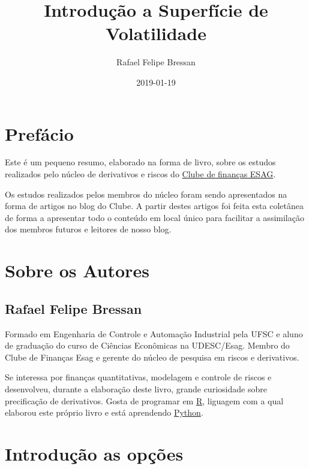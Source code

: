 \documentclass[]{book}
\title{Introdução a Superfície de Volatilidade}
\author{Rafael Felipe Bressan}
\date{2019-01-19}
\begin{document}
\maketitle

{
\setcounter{tocdepth}{1}
\tableofcontents
}
\chapter*{Prefácio}\label{prefacio}

Este é um pequeno resumo, elaborado na forma de livro, sobre os estudos
realizados pelo núcleo de derivativos e riscos do
\href{https://clubedefinancas.com.br}{Clube de finanças ESAG}.

Os estudos realizados pelos membros do núcleo foram sendo apresentados
na forma de artigos no blog do Clube. A partir destes artigos foi feita
esta coletânea de forma a apresentar todo o conteúdo em local único para
facilitar a assimilação dos membros futuros e leitores de nosso blog.

\chapter*{Sobre os Autores}\label{sobre-os-autores}

\section*{Rafael Felipe Bressan}\label{rafael-felipe-bressan}

Formado em Engenharia de Controle e Automação Industrial pela UFSC e
aluno de graduação do curso de Ciências Econômicas na UDESC/Esag. Membro
do Clube de Finanças Esag e gerente do núcleo de pesquisa em riscos e
derivativos.

Se interessa por finanças quantitativas, modelagem e controle de riscos
e desenvolveu, durante a elaboração deste livro, grande curiosidade
sobre precificação de derivativos. Gosta de programar em
\href{https://cran.r-project.org/}{R}, liguagem com a qual elaborou este
próprio livro e está aprendendo \href{https://www.python.org/}{Python}.

\chapter{Introdução as opções}\label{opcoes}
\end{document}
